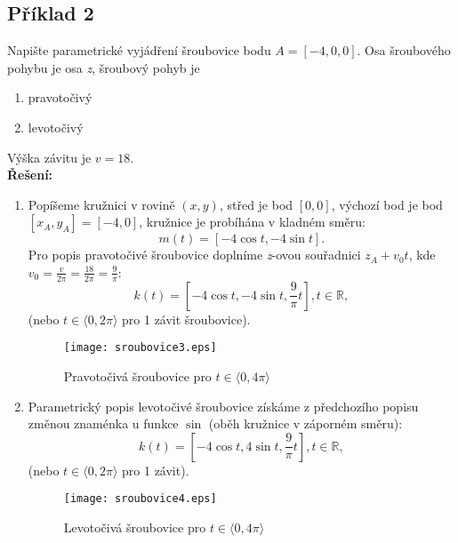 \subsection*{Příklad 2}
Napište parametrické vyjádření šroubovice bodu $A=[-4,0,0]$. Osa šroubového pohybu je osa \textit{z},
šroubový pohyb je
\begin{enumerate}
	\item pravotočivý
	\item levotočivý
\end{enumerate}
Výška závitu je $v=18$. \\[10pt]
\textbf{Řešení: } 
\begin{enumerate}
	\item Popíšeme kružnici v rovině $(x,y)$, střed je bod $[0,0]$, výchozí bod je bod $[x_A, y_A]=[-4,0]$, kružnice je probíhána v kladném směru:
	      $$m(t) = \left[-4\cos{t}, -4\sin{t}\right].$$
	      Pro popis pravotočivé šroubovice doplníme \textit{z}-ovou souřadnici $z_A+v_0t$, kde $v_0=\frac{v}{2\pi}=\frac{18}{2\pi}=\frac{9}{\pi}$:
	      $$k(t) = \left[-4\cos{t}, -4\sin{t}, \frac{9}{\pi}t\right], t \in \mathbb{R},$$
	      (nebo $t \in \langle0, 2\pi\rangle$ pro 1 závit šroubovice).
	      \begin{figure}[H]
	      	\centering
	      	\texttt{[image: sroubovice3.eps]}
	      	\caption{Pravotočivá šroubovice pro $t \in \langle0, 4\pi\rangle$}
	      	
	      \end{figure}	 	
	\item Parametrický popis levotočivé šroubovice získáme z předchozího popisu změnou znaménka u funkce $\sin$ (oběh kružnice v záporném směru):
	      $$k(t) = \left[-4\cos{t}, 4\sin{t}, \frac{9}{\pi}t\right], t \in \mathbb{R},$$
	      (nebo $t \in \langle0, 2\pi\rangle$ pro 1 závit). 	
	      \begin{figure}[H]
	      	\centering
	      	\texttt{[image: sroubovice4.eps]}
	      	\caption{Levotočivá šroubovice pro $t \in \langle0, 4\pi\rangle$}
	      	
	      \end{figure}	 	
\end{enumerate}
\clearpage
